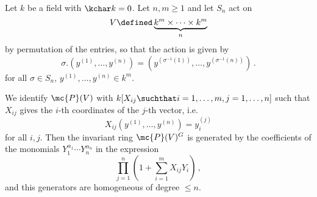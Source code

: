 \begin{theorem}
  \label{theorem: fundamental theorem of vector invariants for the symmetric group}
  Let $k$ be a field with $\kchar k = 0$.
  Let $n, m \geq 1$ and let $S_n$ act on
  \[
              V
    \defined  \underbrace{k^m \times \dotsb \times k^m}_n
  \]
  by permutation of the entries, so that the action is given by
  \[
      \sigma.(y^{(1)}, \dotsc, y^{(n)})
    = (y^{(\sigma^{-1}(1))}, \dotsc, y^{(\sigma^{-1}(n))}) \,.
  \]
  for all $\sigma \in S_n$, $y^{(1)}, \dotsc, y^{(n)} \in k^m$.
  
  We identify $\mc{P}(V)$ with $k[X_{ij} \suchthat i = 1, \dotsc, m, j = 1, \dotsc, n]$ such that $X_{ij}$ gives the $i$-th coordinates of the $j$-th vector, i.e.\
  \[
      X_{ij}(y^{(1)}, \dotsc, y^{(n)})
    = y^{(j)}_i
  \]
  for all $i,j$.
  Then the invariant ring $\mc{P}(V)^G$ is generated by the coefficients of the monomials $Y_1^{\alpha_1} \dotsb Y_n^{\alpha_n}$ in the expression
  \[
    \prod_{j=1}^n \left( 1 + \sum_{i=1}^m X_{ij} Y_i \right) \,,
  \]
  and this generators are homogeneous of degree $\leq n$.
\end{theorem}


